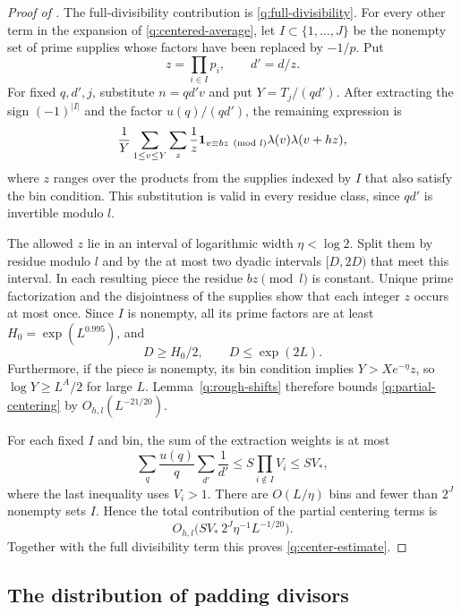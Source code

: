\begin{proof}[Proof of ]
The full-divisibility contribution is \eqref{q:full-divisibility}.
For every other term in the expansion of \eqref{q:centered-average},
let $I\subset\{1,\ldots,J\}$ be the nonempty set of
prime supplies whose factors have been replaced by $-1/p$. Put
\[
 z=\prod_{i\in I}p_i,\qquad d'=d/z.
\]
For fixed $q,d',j$, substitute $n=qd'v$ and put $Y=T_j/(qd')$.
After extracting the sign $(-1)^{|I|}$ and the factor $u(q)/(qd')$, the
remaining expression is
\begin{equation}\label{q:partial-centering}
 \frac1Y\sum_{1\le v\le Y}\sum_z\frac1z
    \mathbf 1_{v\equiv bz\pmod l}\lambda(v)\lambda(v+hz),
\end{equation}
where $z$ ranges over the products from the supplies indexed by $I$ that
also satisfy the bin condition. This substitution is valid in every
residue class, since $qd'$ is invertible modulo $l$.

The allowed $z$ lie in an interval of logarithmic width $\eta<\log2$.
Split them by residue modulo $l$ and by the at most two dyadic intervals
$[D,2D)$ that meet this interval. In each resulting piece the residue
$bz\pmod l$ is constant. Unique prime factorization and the disjointness
of the supplies show that each integer $z$ occurs at most once. Since
$I$ is nonempty, all its prime factors are at least
$H_0=\exp(L^{0.995})$, and
\[
 D\ge H_0/2,\qquad D\le\exp(2L).
\]
Furthermore, if the piece is nonempty, its bin condition implies
$Y>Xe^{-\eta}z$, so $\log Y\ge L^A/2$ for large $L$.
Lemma~\ref{q:rough-shifts} therefore bounds
\eqref{q:partial-centering} by $O_{h,l}(L^{-21/20})$.

For each fixed $I$ and bin, the sum of the extraction weights is at most
\[
 \sum_q\frac{u(q)}q\sum_{d'}\frac1{d'}
 \le S\prod_{i\notin I}V_i\le SV_*,
\]
where the last inequality uses $V_i>1$. There are
$O(L/\eta)$ bins and fewer than $2^J$ nonempty sets $I$. Hence the total
contribution of the partial centering terms is
\[
 O_{h,l}\bigl(SV_*\,2^J\eta^{-1}L^{-1/20}\bigr).
\]
Together with the full divisibility term this proves
\eqref{q:center-estimate}.
\end{proof}

\subsection{The distribution of padding divisors}

